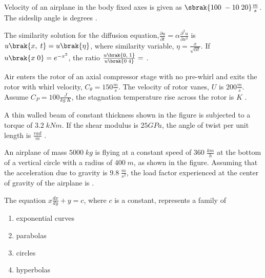 \item Velocity of an airplane in the body fixed axes is given as $\sbrak{100\;-10\;20} \frac{m}{s}$. The sideslip angle is \underline{\hspace{2cm}} degrees .
\item The similarity solution for the diffusion equation,$\frac{\partial u}{\partial t}=\alpha \frac{\partial^2u}{\partial x^2}$ is $u\brak{x,\;t}=u\brak{\eta}$, where similarity variable, $\eta=\frac{x}{\sqrt{\alpha t}}$. If $u\brak{x\;0}=e^{-x^2}$, the ratio $\frac{u\brak{0,\;1}}{u\brak{0\;4}}=$ \underline{\hspace{2cm}} .
\item Air enters the rotor of an axial compressor stage with no pre-whirl  and exits the rotor with whirl velocity, $C_\theta=150\frac{m}{s}$. The velocity of rotor vanes, $U$ is $200 \frac{m}{s}$. Assume $C_P=100\frac{J}{kg\;K}$, the stagnation temperature rise across the rotor is \underline{\hspace{2cm}} $K$ .
\item A thin walled beam of constant thickness shown in the figure is subjected to a torque of $3.2\;kNm$. If the shear modulus is $25 GPa$, the angle of twist per unit length is \underline{\hspace{2cm}} $\frac{rad}{m}$ .

\item An airplane of mass $5000\;kg$ is flying at a constant speed of $360\;\frac{km}{h}$ at the bottom of a vertical circle with a radius of $400\;m$, as shown in the figure. Assuming that the acceleration due to gravity is $9.8\;\frac{m}{s^2}$, the load factor experienced at the center of gravity of the airplane is \underline{\hspace{2cm}} . 

\item The equation $x\frac{dx}{dy}+y=c$, where $c$ is a constant, represents a family of
\begin{enumerate}
    \item exponential curves 
    \item parabolas 
    \item circles
    \item hyperbolas
\end{enumerate}

